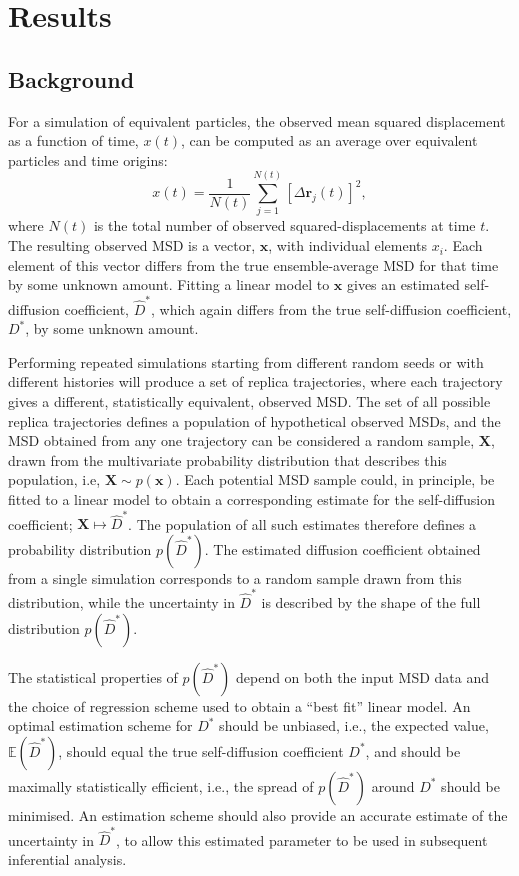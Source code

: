 \documentclass[reprint,superscriptaddress,nobibnotes,amsmath,amssymb,aps,prx,hidelinks,linenumbers]{revtex4-2}
\newcommand{\oMSD}{\ensuremath{\bm{x}}}
\newcommand{\oMSDs}[1]{\ensuremath{x}(#1)}
\newcommand{\oMSDi}{\ensuremath{x_i}}
\newcommand{\prob}[1]{\ensuremath{p(#1)}}
\newcommand{\Dest}{\ensuremath{\widehat{D}^*}}
\newcommand{\D}{\ensuremath{D^*}}
\begin{document}
\section{Results}
\subsection{Background}

For a simulation of equivalent particles, the observed mean squared displacement as a function of time, $\oMSDs{t}$, can be computed as an average over equivalent particles and time origins:
%
\begin{equation}
  \oMSDs{t} = \frac{1}{N(t)}\sum^{N(t)}_{j=1}{\left[\Delta\mathbf{r}_j(t)\right]}^2,
  \label{equ:observed_msd}
\end{equation}
%
where $N(t)$ is the total number of observed squared-displacements at time $t$.
The resulting observed MSD is a vector, $\oMSD$, with individual elements $\oMSDi$.
Each element of this vector differs from the true ensemble-average MSD for that time by some unknown amount.
Fitting a linear model to $\oMSD$ gives an estimated self-diffusion coefficient, $\Dest$, which again differs from the true self-diffusion coefficient, $\D$, by some unknown amount.

Performing repeated simulations starting from different random seeds or with different histories will produce a set of replica trajectories, where each trajectory gives a different, statistically equivalent, observed MSD.
The set of all possible replica trajectories defines a population of hypothetical observed MSDs, and the MSD obtained from any one trajectory can be considered a random sample, $\bm{X}$, drawn from the multivariate probability distribution that describes this population, i.e, $\bm{X} \sim \prob{\oMSD}$.
Each potential MSD sample could, in principle, be fitted to a linear model to obtain a corresponding estimate for the self-diffusion coefficient; $\bm{X} \mapsto \Dest$.
The population of all such estimates therefore defines a probability distribution $\prob{\Dest}$.
The estimated diffusion coefficient obtained from a single simulation corresponds to a random sample drawn from this distribution, while the uncertainty in $\Dest$ is described by the shape of the full distribution $\prob{\Dest}$.

The statistical properties of $p(\Dest)$ depend on both the input MSD data and the choice of regression scheme used to obtain a ``best fit'' linear model.
An optimal estimation scheme for $\D$ should be unbiased, i.e., the expected value, $\mathbb{E}(\Dest)$, should equal the true self-diffusion coefficient $\D$, and should be maximally statistically efficient, i.e., the spread of $p(\Dest)$ around $\D$ should be minimised.
An estimation scheme should also provide an accurate estimate of the uncertainty in $\Dest$, to allow this estimated parameter to be used in subsequent inferential analysis.
\end{document}
